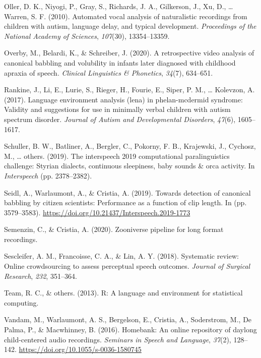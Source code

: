 \documentclass[english,,man]{apa6}
\begin{document}
\leavevmode\hypertarget{ref-oller2010automated}{}%
Oller, D. K., Niyogi, P., Gray, S., Richards, J. A., Gilkerson, J., Xu, D., \ldots{} Warren, S. F. (2010). Automated vocal analysis of naturalistic recordings from children with autism, language delay, and typical development. \emph{Proceedings of the National Academy of Sciences}, \emph{107}(30), 13354--13359.

\leavevmode\hypertarget{ref-overby2020retrospective}{}%
Overby, M., Belardi, K., \& Schreiber, J. (2020). A retrospective video analysis of canonical babbling and volubility in infants later diagnosed with childhood apraxia of speech. \emph{Clinical Linguistics \& Phonetics}, \emph{34}(7), 634--651.

\leavevmode\hypertarget{ref-rankine2017language}{}%
Rankine, J., Li, E., Lurie, S., Rieger, H., Fourie, E., Siper, P. M., \ldots{} Kolevzon, A. (2017). Language environment analysis (lena) in phelan-mcdermid syndrome: Validity and suggestions for use in minimally verbal children with autism spectrum disorder. \emph{Journal of Autism and Developmental Disorders}, \emph{47}(6), 1605--1617.

\leavevmode\hypertarget{ref-schuller2019interspeech}{}%
Schuller, B. W., Batliner, A., Bergler, C., Pokorny, F. B., Krajewski, J., Cychosz, M., \ldots{} others. (2019). The interspeech 2019 computational paralinguistics challenge: Styrian dialects, continuous sleepiness, baby sounds \& orca activity. In \emph{Interspeech} (pp. 2378--2382).

\leavevmode\hypertarget{ref-Seidl19}{}%
Seidl, A., Warlaumont, A., \& Cristia, A. (2019). Towards detection of canonical babbling by citizen scientists: Performance as a function of clip length. In (pp. 3579--3583). \url{https://doi.org/10.21437/Interspeech.2019-1773}

\leavevmode\hypertarget{ref-semenzin2020zooniverse}{}%
Semenzin, C., \& Cristia, A. (2020). Zooniverse pipeline for long format recordings.

\leavevmode\hypertarget{ref-sescleifer2018systematic}{}%
Sescleifer, A. M., Francoisse, C. A., \& Lin, A. Y. (2018). Systematic review: Online crowdsourcing to assess perceptual speech outcomes. \emph{Journal of Surgical Research}, \emph{232}, 351--364.

\leavevmode\hypertarget{ref-team2013r}{}%
Team, R. C., \& others. (2013). R: A language and environment for statistical computing.

\leavevmode\hypertarget{ref-vandam2016homebank}{}%
Vandam, M., Warlaumont, A. S., Bergelson, E., Cristia, A., Soderstrom, M., De Palma, P., \& Macwhinney, B. (2016). Homebank: An online repository of daylong child-centered audio recordings. \emph{Seminars in Speech and Language}, \emph{37}(2), 128--142. \url{https://doi.org/10.1055/s-0036-1580745}
\end{document}
